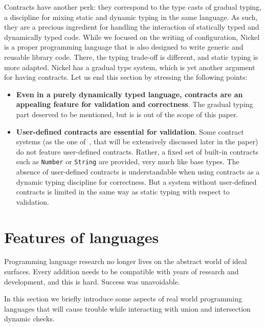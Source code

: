 \documentclass[sigplan,10pt,review,anonymous]{acmart}
\newcommand{\info}[2][1=]{}
\newcommand{\nickel}[1]{\lstinline[language=nickel]{#1}}
\begin{document}
Contracts have another perk: they correspond to the type casts of gradual
typing, a discipline for mixing static and dynamic typing in the same language.
As such, they are a precious ingredient for handling the interaction of
statically typed and dynamically typed code. While we focused on the writing of
configuration, Nickel is a proper programming language that is also designed to
write generic and reusable library code. There, the typing trade-off is
different, and static typing is more adapted. Nickel has a gradual type system,
which is yet another argument for having contracts. Let us end this section by
stressing the following points:
\begin{itemize}
    \item \textbf{Even in a purely dynamically typed language, contracts are an
        appealing feature for validation and correctness}. The gradual
        typing part deserved to be mentioned, but is is out of the scope of this
        paper.
    \item \textbf{User-defined contracts are essential for validation}. Some
        contract systems (as the one of~\cite{RootCauseOfBlame}, that will be
        extensively discussed later in the paper) do not feature user-defined
        contracts.  Rather, a fixed set of built-in contracts such as
        \nickel{Number} or \nickel{String} are provided, very much like base
        types. The absence of user-defined contracts is understandable when
        using contracts as a dynamic typing discipline for correctness. But a
        system without user-defined contracts is limited in the same way as
        static typing with respect to validation.
\end{itemize}

\newpage

\section{Features of languages}
\info{Zoology of various features that we will eventually show
  conflict with this or that property or implementation of union and
  intersection. Including user-define contracts.}

Programming language research no longer lives on the abstract world
of ideal surfaces.
Every addition needs to be compatible with years of research
and development, and this is hard.
Success was unavoidable.

In this section we briefly introduce some aspects of real world
programming languages that will cause trouble while interacting
with union and intersection dynamic checks.
\end{document}
